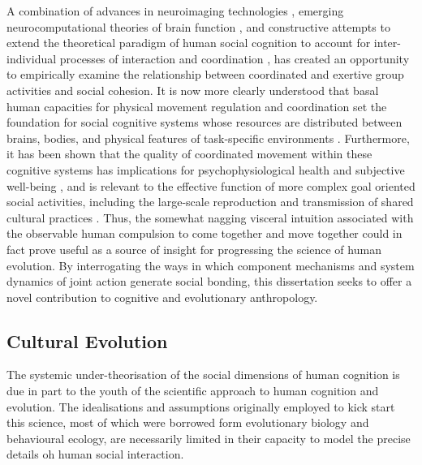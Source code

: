 A combination of advances in neuroimaging technologies \citep{Frith2007}, emerging neurocomputational theories of brain function \citep{Friston2010,Frith2010,Clark2013}, and constructive attempts to extend the theoretical paradigm of human social cognition to account for inter-individual processes of interaction and coordination \citep{Sebanz2006,Dale2014}, has created an opportunity to empirically examine the relationship between coordinated and exertive group activities and social cohesion.  It is now more clearly understood that basal human capacities for physical movement regulation and coordination set the foundation for social cognitive systems whose resources are distributed between brains, bodies, and physical features of task-specific environments \citep{Hutchins2000,Kirsh2006,Semin2008,Semin2012,Coey2012}.  Furthermore, it has been shown that the quality of coordinated movement within these cognitive systems has implications for psychophysiological health and subjective well-being \citep{Wheatley2012}, and is relevant to the effective function of more complex goal oriented social activities, including the large-scale reproduction and transmission of shared cultural practices \citep{Dunbar2012,Roepstorff2010,Claidiere2014,Launay2016}. Thus, the somewhat nagging visceral intuition associated with the observable human compulsion to come together and move together could in fact prove useful as a source of insight for progressing the science of human evolution.  By interrogating the ways in which component mechanisms and system dynamics of joint action generate social bonding, this dissertation seeks to offer a novel contribution to cognitive and evolutionary anthropology.



\subsection{Cultural Evolution} %
The systemic under-theorisation of the social dimensions of human cognition is due in part to the youth of the scientific approach to human cognition and evolution. The idealisations and assumptions originally employed to kick start this science, most of which were borrowed form evolutionary biology and behavioural ecology, are necessarily limited in their capacity to model the precise details oh human social interaction.

